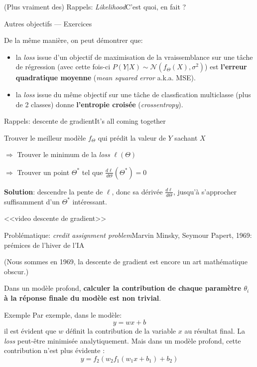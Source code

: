 \documentclass[12pt,dvipsnames,aspectratio=169]{beamer}
\begin{document}
\begin{frame}{(Plus vraiment des) Rappels: \textit{Likelihood}}{C'est quoi, en fait ?}

    \begin{exampleblock}{Autres objectifs --- Exercices}

        De la même manière, on peut démontrer que:
        \begin{itemize}
            \item la \textit{loss} issue d'un objectif de maximisation de la vraissemblance sur une tâche de régression (avec cette fois-ci $P(Y|X) \sim \mathcal{N}(f_\Theta(X), \sigma^2)$) est \textbf{l'erreur quadratique moyenne} (\textit{mean squared error} a.k.a. MSE).
            \item la \textit{loss} issue du même objectif sur une tâche de classfication multiclasse (plus de 2 classes) donne \textbf{l'entropie croisée} (\textit{crossentropy}).
        \end{itemize}


    \end{exampleblock}

\end{frame}

\begin{frame}{Rappels: descente de gradient}{It's all coming together}

Trouver le meilleur modèle $f_\Theta$ qui prédit la valeur de $Y$ sachant $X$ \par
$\Rightarrow$ Trouver le minimum de la \textit{loss} $\ell(\Theta)$ \par
$\Rightarrow$ Trouver un point $\Theta^*$ tel que $\frac{d\ell}{d\Theta}(\Theta^*) = 0$

\vspace{1em}

\textbf{Solution}: descendre la pente de $\ell$, donc sa dérivée $\frac{d\ell}{d\Theta}$, jusqu'à s'approcher suffisamment d'un $\Theta^*$ intéressant.

<<video descente de gradient>>

\end{frame}


\begin{frame}{Problématique: \textit{credit assignment problem}}{Marvin Minsky, Seymour Papert, 1969: prémices de l'hiver de l'IA}

\small{(Nous sommes en 1969, la descente de gradient est encore un art mathématique obscur.)}

Dans un modèle profond, \textbf{calculer la contribution de chaque paramètre $\theta_i$ à la réponse finale du modèle est non trivial}.

\begin{exampleblock}{Exemple}
    Par exemple, dans le modèle:
    $$y = wx + b$$
    il est évident que $w$ définit la contribution de la variable $x$ au résultat final. La \textit{loss} peut-être minimisée analytiquement.
    Mais dans un modèle profond, cette contribution n'est plus évidente :
    $$y = f_2(w_2f_1(w_1x + b_1)+b_2)$$
\end{exampleblock}


\end{frame}
\end{document}
